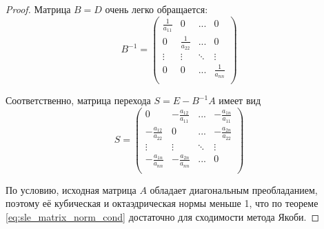 \documentclass{article}
\begin{document}
\begin{proof}
	Матрица $B=D$ очень легко обращается:
	\[B^{-1}=
		\begin{pmatrix}
			\frac{1}{a_{11}}	& 0	& ...	& 0 \\
			0	& \frac{1}{a_{22}}& ...	& 0 \\
			\vdots	& \vdots&\ddots &\vdots \\
			0	& 0	& ...	& \frac{1}{a_{nn}} \\
		\end{pmatrix}
	\]

	Соответственно, матрица перехода $S=E-B^{-1}A$ имеет вид
	\[S=
		\begin{pmatrix}
			0	&-\frac{a_{12}}{a_{11}} &... &
				-\frac{a_{1n}}{a_{11}} \\
			-\frac{a_{12}}{a_{22}}& 0	&... &
				-\frac{a_{2n}}{a_{22}} \\
			\vdots	& \vdots&\ddots &\vdots \\
			-\frac{a_{1n}}{a_{nn}}	& -\frac{a_{2n}}{a_{nn}} &
				...	& 0 \\
		\end{pmatrix}
	\]

	По условию, исходная матрица $A$ обладает диагональным преобладанием,
	поэтому её кубическая и октаэдрическая нормы меньше 1, что по
	теореме \eqref{eq:sle_matrix_norm_cond} достаточно для сходимости метода
	Якоби.
\end{proof}
\end{document}
